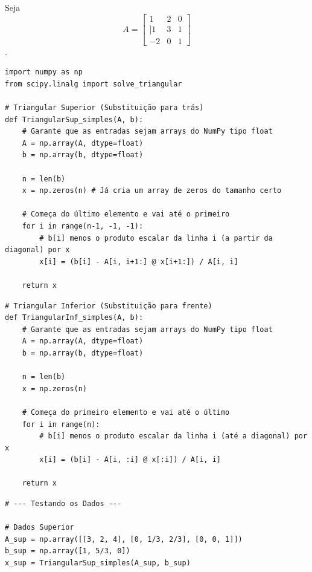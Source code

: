 \documentclass[../numerical_methods.tex]{subfiles}
\begin{document}
\begin{exr}
	Seja
	\[
		A = \begin{bmatrix}
			1  & 2 & 0 \\ ]
			1  & 3 & 1 \\
			-2 & 0 & 1
		\end{bmatrix}
	\].

	\begin{listing}[H]
		\caption{Implementação do Método LU}
		\begin{verbatim}
import numpy as np
from scipy.linalg import solve_triangular

# Triangular Superior (Substituição para trás)
def TriangularSup_simples(A, b):
    # Garante que as entradas sejam arrays do NumPy tipo float
    A = np.array(A, dtype=float)
    b = np.array(b, dtype=float)

    n = len(b)
    x = np.zeros(n) # Já cria um array de zeros do tamanho certo

    # Começa do último elemento e vai até o primeiro
    for i in range(n-1, -1, -1):
        # b[i] menos o produto escalar da linha i (a partir da diagonal) por x
        x[i] = (b[i] - A[i, i+1:] @ x[i+1:]) / A[i, i]

    return x
 \end{verbatim}

		\begin{verbatim}
# Triangular Inferior (Substituição para frente)
def TriangularInf_simples(A, b):
    # Garante que as entradas sejam arrays do NumPy tipo float
    A = np.array(A, dtype=float)
    b = np.array(b, dtype=float)

    n = len(b)
    x = np.zeros(n)

    # Começa do primeiro elemento e vai até o último
    for i in range(n):
        # b[i] menos o produto escalar da linha i (até a diagonal) por x
        x[i] = (b[i] - A[i, :i] @ x[:i]) / A[i, i]

    return x
  \end{verbatim}
	\end{listing}
	\begin{listing}[H]
		\begin{verbatim}
# --- Testando os Dados ---

# Dados Superior
A_sup = np.array([[3, 2, 4], [0, 1/3, 2/3], [0, 0, 1]])
b_sup = np.array([1, 5/3, 0])
x_sup = TriangularSup_simples(A_sup, b_sup)


\end{verbatim}
\end{listing}
\end{exr}
\end{document}

